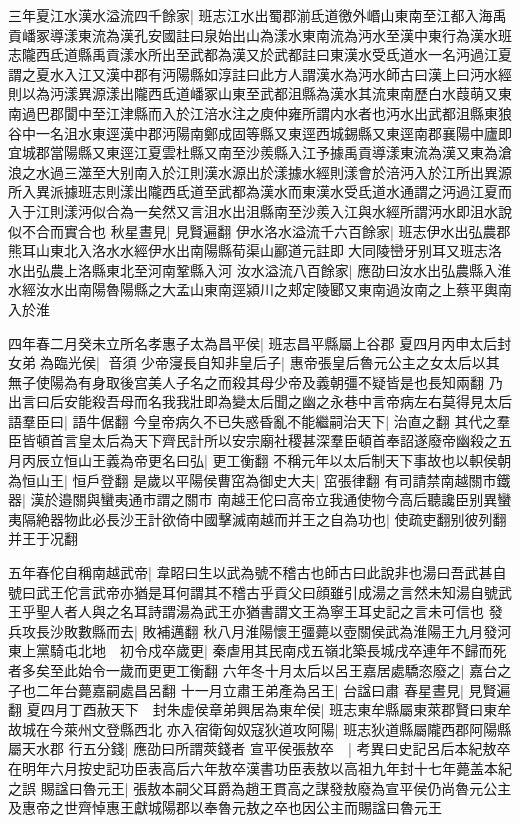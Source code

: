 三年夏江水漢水溢流四千餘家|{
	班志江水出蜀郡湔氐道徼外㟭山東南至江都入海禹貢嶓冢導漾東流為漢孔安國註曰泉始出山為漾水東南流為沔水至漢中東行為漢水班志隴西氐道縣禹貢漾水所出至武都為漢又於武都註曰東漢水受氐道水一名沔過江夏謂之夏水入江又漢中郡有沔陽縣如淳註曰此方人謂漢水為沔水師古曰漢上曰沔水經則以為沔漾異源漾出隴西氐道嶓冢山東至武都沮縣為漢水其流東南歷白水葭萌又東南過巴郡閬中至江津縣而入於江涪水注之庾仲雍所謂内水者也沔水出武都沮縣東狼谷中一名沮水東逕漢中郡沔陽南鄭成固等縣又東逕西城錫縣又東逕南郡襄陽中廬即宜城郡當陽縣又東逕江夏雲杜縣又南至沙羨縣入江予據禹貢導漾東流為漢又東為滄浪之水過三澨至大别南入於江則漢水源出於漾據水經則漾會於涪沔入於江所出異源所入異派據班志則漾出隴西氐道至武都為漢水而東漢水受氐道水通謂之沔過江夏而入于江則漾沔似合為一矣然又言沮水出沮縣南至沙羨入江與水經所謂沔水即沮水說似不合而實合也}
秋星晝見|{
	見賢遍翻}
伊水洛水溢流千六百餘家|{
	班志伊水出弘農郡熊耳山東北入洛水水經伊水出南陽縣荀渠山酈道元註即大同陵巒牙别耳又班志洛水出弘農上洛縣東北至河南鞏縣入河}
汝水溢流八百餘家|{
	應劭曰汝水出弘農縣入淮水經汝水出南陽魯陽縣之大孟山東南逕潁川之郏定陵郾又東南過汝南之上蔡平輿南入於淮}


四年春二月癸未立所名孝惠子太為昌平侯|{
	班志昌平縣屬上谷郡}
夏四月丙申太后封女弟為臨光侯|{
	音須}
少帝寖長自知非皇后子|{
	惠帝張皇后魯元公主之女太后以其無子使陽為有身取後宫美人子名之而殺其母少帝及義朝彊不疑皆是也長知兩翻}
乃出言曰后安能殺吾母而名我我壯即為變太后聞之幽之永巷中言帝病左右莫得見太后語羣臣曰|{
	語牛倨翻}
今皇帝病久不已失惑昏亂不能繼嗣治天下|{
	治直之翻}
其代之羣臣皆頓首言皇太后為天下齊民計所以安宗廟社稷甚深羣臣頓首奉詔遂廢帝幽殺之五月丙辰立恒山王義為帝更名曰弘|{
	更工衡翻}
不稱元年以太后制天下事故也以軹侯朝為恒山王|{
	恒戶登翻}
是歲以平陽侯曹窋為御史大夫|{
	窋張律翻}
有司請禁南越關市鐵器|{
	漢於邉關與蠻夷通市謂之關市}
南越王佗曰高帝立我通使物今高后聽讒臣别異蠻夷隔絶器物此必長沙王計欲倚中國擊滅南越而并王之自為功也|{
	使疏吏翻别彼列翻并王于况翻}


五年春佗自稱南越武帝|{
	韋眧曰生以武為號不稽古也師古曰此說非也湯曰吾武甚自號曰武王佗言武帝亦猶是耳何謂其不稽古乎貢父曰顔雖引成湯之言然未知湯自號武王乎聖人者人與之名耳詩謂湯為武王亦猶書謂文王為寧王耳史記之言未可信也}
發兵攻長沙敗數縣而去|{
	敗補邁翻}
秋八月淮陽懷王彊薨以壺關侯武為淮陽王九月發河東上黨騎屯北地　初令戍卒歲更|{
	秦虐用其民南戍五嶺北築長城戌卒連年不歸而死者多矣至此始令一歲而更更工衡翻}
六年冬十月太后以呂王嘉居處驕恣廢之|{
	嘉台之子也二年台薨嘉嗣處昌呂翻}
十一月立肅王弟產為呂王|{
	台諡曰肅}
春星晝見|{
	見賢遍翻}
夏四月丁酉赦天下　封朱虚侯章弟興居為東牟侯|{
	班志東牟縣屬東萊郡賢曰東牟故城在今萊州文登縣西北}
亦入宿衛匈奴寇狄道攻阿陽|{
	班志狄道縣屬隴西郡阿陽縣屬天水郡}
行五分錢|{
	應劭曰所謂莢錢者}
宣平侯張敖卒　|{
	考異曰史記呂后本紀敖卒在明年六月按史記功臣表高后六年敖卒漢書功臣表敖以高祖九年封十七年薨盖本紀之誤}
賜諡曰魯元王|{
	張敖本嗣父耳爵為趙王貫高之謀發敖廢為宣平侯仍尚魯元公主及惠帝之世齊悼惠王獻城陽郡以奉魯元敖之卒也因公主而賜諡曰魯元王}


